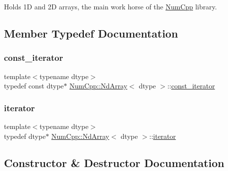 Holds 1D and 2D arrays, the main work horse of the \mbox{\hyperlink{namespace_num_cpp}{Num\+Cpp}} library. 

\subsection{Member Typedef Documentation}
\mbox{\label{class_num_cpp_1_1_nd_array_a770eaf3b67efaa19e310ed14eee5aabb}} 
\subsubsection{\texorpdfstring{const\+\_\+iterator}{const\_iterator}}
{\footnotesize\ttfamily template$<$typename dtype$>$ \\
typedef const dtype$\ast$ \mbox{\hyperlink{class_num_cpp_1_1_nd_array}{Num\+Cpp\+::\+Nd\+Array}}$<$ dtype $>$\+::\mbox{\hyperlink{class_num_cpp_1_1_nd_array_a770eaf3b67efaa19e310ed14eee5aabb}{const\+\_\+iterator}}}

\mbox{\label{class_num_cpp_1_1_nd_array_ac56493775d6c0ff556ed7d6c9e7c07b4}} 
\subsubsection{\texorpdfstring{iterator}{iterator}}
{\footnotesize\ttfamily template$<$typename dtype$>$ \\
typedef dtype$\ast$ \mbox{\hyperlink{class_num_cpp_1_1_nd_array}{Num\+Cpp\+::\+Nd\+Array}}$<$ dtype $>$\+::\mbox{\hyperlink{class_num_cpp_1_1_nd_array_ac56493775d6c0ff556ed7d6c9e7c07b4}{iterator}}}



\subsection{Constructor \& Destructor Documentation}
\mbox{\label{class_num_cpp_1_1_nd_array_a77687fd6deacb19d577dfc7cc8dbef52}} 
